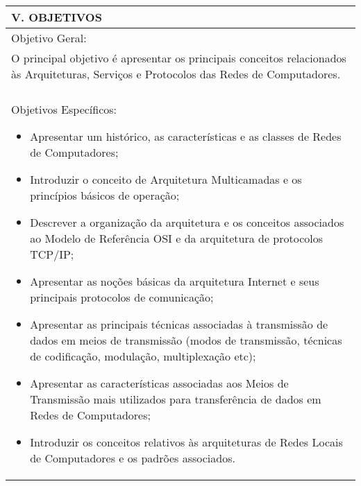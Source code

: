 \documentclass[12pt]{article}
\begin{document}
\begin{longtable}{|L{1.025\textwidth}|} \hline
%
{\bf V. OBJETIVOS } \\ \hline
%
Objetivo Geral:\\

O principal objetivo é apresentar os principais conceitos relacionados às Arquiteturas, Serviços e Protocolos das Redes de Computadores. \\
\\
Objetivos Específicos:

\begin{itemize}
\item Apresentar um histórico, as características e as classes de Redes de Computadores;
\item Introduzir o conceito de Arquitetura Multicamadas e os princípios básicos de operação;
\item Descrever a organização da arquitetura e os conceitos associados ao Modelo de Referência  OSI e da arquitetura de protocolos TCP/IP;
\item Apresentar as noções básicas da arquitetura Internet e seus principais protocolos de comunicação;
\item Apresentar as principais técnicas associadas à transmissão de dados em meios de transmissão (modos de transmissão, técnicas de codificação, modulação, multiplexação etc);
\item Apresentar as características associadas aos Meios de Transmissão mais utilizados para transferência de dados em Redes de Computadores;
\item Introduzir os conceitos relativos às arquiteturas de Redes Locais de Computadores e os padrões associados.
\end{itemize}


\\ \hline
\end{longtable}
\end{document}
